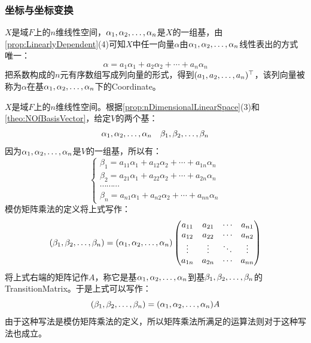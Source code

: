 \subsubsection{坐标与坐标变换}
\begin{definition}
	$X$是域$F$上的$n$维线性空间，$\alpha_1, \alpha_2, \dots, \alpha_{n}$是$X$的一组基，由\cref{prop:LinearlyDependent}(4)可知$X$中任一向量$\alpha$由$\alpha_1, \alpha_2, \dots, \alpha_{n}$线性表出的方式唯一：
	\begin{equation*}
		\alpha=a_1\alpha_1+a_2\alpha_2+\cdots+a_n\alpha_n
	\end{equation*}
	把系数构成的$n$元有序数组写成列向量的形式，得到$(a_1, a_2, \dots, a_{n})^{\top}$，该列向量被称为$\alpha$在基$\alpha_1, \alpha_2, \dots, \alpha_{n}$下的\gls{Coordinate}。
\end{definition}
\begin{definition}
	$X$是域$F$上的$n$维线性空间。根据\cref{prop:nDimensionalLinearSpace}(3)和\cref{theo:NOfBasisVector}，给定$V$的两个基：
	\begin{equation*}
		\alpha_1, \alpha_2, \dots, \alpha_{n}\quad\beta_1, \beta_2, \dots, \beta_{n}
	\end{equation*}
	因为$\alpha_1, \alpha_2, \dots, \alpha_{n}$是$V$的一组基，所以有：
	\begin{equation*}
		\begin{cases}
			\beta_1=a_{11}\alpha_1+a_{12}\alpha_2+\cdots+a_{1n}\alpha_n \\
			\beta_2=a_{21}\alpha_1+a_{22}\alpha_2+\cdots+a_{2n}\alpha_n \\
			\cdots\cdots\cdots \\
			\beta_n=a_{n1}\alpha_1+a_{n2}\alpha_2+\cdots+a_{nn}\alpha_n
		\end{cases}
	\end{equation*}
	模仿矩阵乘法的定义将上式写作：
	\begin{equation*}
		(\beta_1, \beta_2, \dots, \beta_{n})=(\alpha_1, \alpha_2, \dots, \alpha_{n})
		\begin{pmatrix}
			a_{11} & a_{21} & \cdots & a_{n1} \\
			a_{12} & a_{22} & \cdots & a_{n2} \\
			\vdots & \vdots & \ddots & \vdots \\
			a_{1n} & a_{2n} & \cdots & a_{nn}
		\end{pmatrix}
	\end{equation*}
	将上式右端的矩阵记作$A$，称它是基$\alpha_1, \alpha_2, \dots, \alpha_{n}$到基$\beta_1, \beta_2, \dots, \beta_{n}$的\gls{TransitionMatrix}。于是上式可以写作：
	\begin{equation*}
		(\beta_1, \beta_2, \dots, \beta_{n})=(\alpha_1, \alpha_2, \dots, \alpha_{n})A
	\end{equation*}
	由于这种写法是模仿矩阵乘法的定义，所以矩阵乘法所满足的运算法则对于这种写法也成立。
\end{definition}
